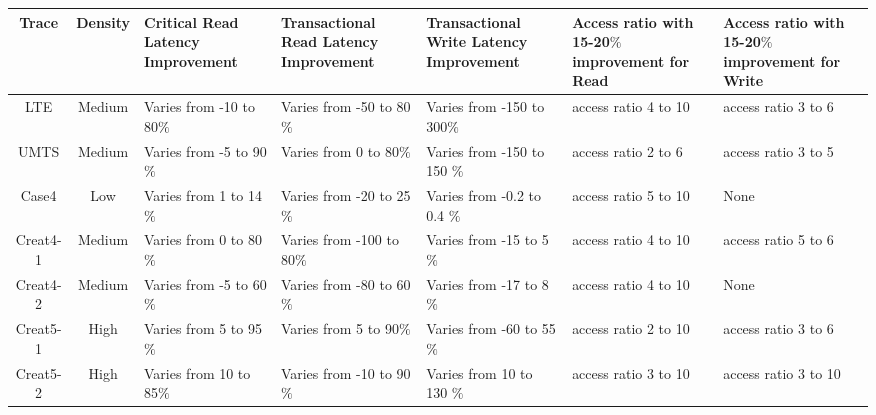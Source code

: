 \begin{landscape}
\begin{table}[tbp]
	\centering
	\begin{tabular}{|c|c|p{4cm}|p{4.2cm}|p{4.2cm}|p{3.3cm}|p{3.3cm}| }
\hline
Trace & Density & Critical Read Latency Improvement & Transactional Read Latency Improvement & Transactional Write Latency Improvement & Access ratio with 15-20$\%$ improvement for Read & Access ratio with 15-20$\%$ improvement for Write\\
\hline
\hline
LTE & Medium &Varies from  -10 to 80$\%$ & Varies from -50 to 80$\%$ & Varies from -150 to 300$\%$ & access ratio 4 to 10 & access ratio 3 to 6 \\
\hline 
UMTS & Medium &Varies from   -5 to 90$\%$ & Varies from 0 to 80$\%$ & Varies from -150 to 150 $\%$ & access ratio 2 to 6 & access ratio 3 to 5 \\
\hline
Case4 & Low &Varies from 1 to 14$\%$ & Varies from -20 to 25$\%$ & Varies from -0.2 to 0.4 $\%$ & access ratio 5 to 10 & None \\
\hline
Creat4-1 & Medium &Varies from 0 to 80$\%$ & Varies from -100 to 80$\%$ & Varies from -15 to 5 $\%$ & access ratio 4 to 10 & access ratio 5 to 6\\
\hline
Creat4-2 & Medium &Varies from -5 to 60$\%$ & Varies from -80 to 60$\%$ & Varies from -17 to 8 $\%$ & access ratio 4 to 10 & None \\
\hline
Creat5-1 & High &Varies from 5 to 95$\%$ & Varies from 5 to 90$\%$ & Varies from -60 to 55 $\%$ & access ratio 2 to 10 & access ratio 3 to 6 \\
\hline
Creat5-2 & High &Varies from 10 to 85$\%$ & Varies from -10 to 90$\%$ & Varies from 10 to 130 $\%$ & access ratio 3 to 10 & access ratio 3 to 10 \\

\end{tabular}
\end{table}
\end{landscape}
